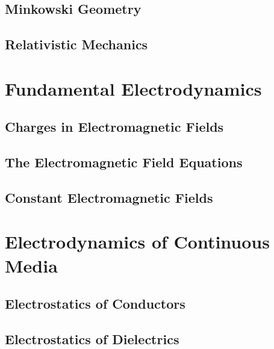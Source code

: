 \documentclass[
    ebook,
    11pt,
    oneside,
    onecolumn,
    openright,
    final
]{memoir}
\numberwithin{equation}{section}
\begin{document}
\chapter{Minkowski Geometry}

\chapter{Relativistic Mechanics}

\part{Fundamental Electrodynamics}

\chapter[Charges in EM Fields]{Charges in Electromagnetic Fields}
\label{ch:05a}








\chapter[The EM Field Equations]{The Electromagnetic Field Equations}
\label{ch:06a}


% 

\chapter[Constant EM Fields]{Constant Electromagnetic Fields}
\label{ch:07a}

\part{Electrodynamics of Continuous Media}

\chapter{Electrostatics of Conductors}

\chapter{Electrostatics of Dielectrics}
\end{document}
